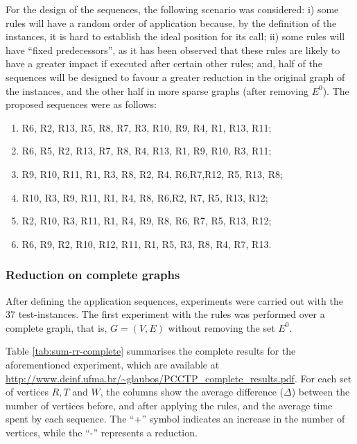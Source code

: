 \documentclass{singlecol-new}
\theoremstyle{TH}{
\newtheorem{lemma}{Lemma}
\newtheorem{theorem}[lemma]{Theorem}
\newtheorem{corrolary}[lemma]{Corrolary}
\newtheorem{conjecture}[lemma]{Conjecture}
\newtheorem{proposition}[lemma]{Proposition}
\newtheorem{claim}[lemma]{Claim}
\newtheorem{stheorem}[lemma]{Wrong Theorem}
}
\theoremstyle{THrm}{
\newtheorem{definition}{Definition}[section]
\newtheorem{question}{Question}[section]
\newtheorem{remark}{Remark}
\newtheorem{scheme}{Scheme}
}
\theoremstyle{THhit}{
\newtheorem{case}{Case}[section]
}
\begin{document}
For the design of the sequences, the following scenario was considered: i) some rules will have a random order of application because, by the definition of the instances, it is hard to establish the ideal position for its call; ii) some rules will have ``fixed predecessors'', as it has been observed that these rules are likely to have a greater impact if executed after certain other rules; and, half of the sequences will be designed to favour a greater reduction in the original graph of the instances, and the other half in more sparse graphs (after removing $ E^0$). The proposed sequences were as follows:

{\footnotesize
	\begin{enumerate}[A:]
		
		\item  R6, R2, R13, R5, R8, R7, R3, R10, R9, R4, R1, R13, R11;  
		
		\item  R6, R5, R2, R13, R7, R8, R4, R13, R1, R9, R10, R3, R11; 
		
		\item  R9, R10,  R11, R1, R3, R8, R2, R4, R6,R7,R12, R5, R13, R8;
		
		\item  R10, R3, R9, R11, R1, R4, R8, R6,R2, R7, R5, R13, R12;
		
		\item R2, R10, R3, R11, R1, R4, R9, R8, R6,   R7, R5, R13, R12;
		
		\item R6, R9, R2, R10, R12, R11, R1, R5, R3, R8, R4, R7, R13.
		
	\end{enumerate}
}


\subsubsection{Reduction on complete graphs}
After defining the application sequences, experiments were carried out with the 37 test-instances. The first experiment with the rules was performed over a complete graph, that is, $G=(V,E)$ without removing the set $E^0$.

Table \ref{tab:sum-rr-complete}  summarises the complete results for the aforementioned experiment, which are available at \url{http://www.deinf.ufma.br/~glaubos/PCCTP_complete_results.pdf}. For each set of vertices $ R, T $ and $ W $, the columns show the average difference ($ \Delta $) between the number of vertices before, and after  applying the rules, and the average time spent by each sequence.
The ``+'' symbol indicates an increase in the number of vertices, while the ``-'' represents a reduction.
\end{document}
